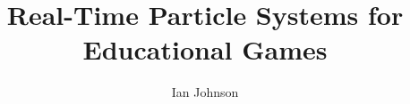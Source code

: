 \documentclass[11pt]{fsuthesis}
\title{Real-Time Particle Systems for Educational Games}
\author{Ian Johnson}
\begin{document}
\frontmatter
\maketitle
\makesignaturepage



\tableofcontents
\listoffigures



\begin{abstract}
\end{abstract}

\mainmatter










\pagebreak

\appendix




%

%



\begin{biosketch}
\end{biosketch}
\end{document}
